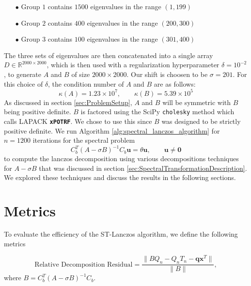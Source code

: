 \begin{itemize}
    \item[$\bullet$] Group $1$ contains $1500$ eigenvalues in the range $(1, 199)$
    \item[$\bullet$] Group $2$ contains $400$ eigenvalues in the range $(200, 300)$
    \item[$\bullet$] Group $3$ contains $100$ eigenvalues in the range $(301, 400)$
\end{itemize}

The three sets of eigenvalues are then concatenated into a single array $D \in \mathbb{R}^{2000 \times 2000}$, which is then used with a regularization hyperparameter $\delta = 10^{-2}$, to generate $A$ and $B$ of size $2000 \times 2000$. Our shift is choosen to be $\sigma = 201$. For this choice of $\delta$, the condition number of $A$ and $B$ are as follows:
\begin{equation*}
    \kappa(A) = 1.23 \times 10^7, \qquad \kappa(B) = 5.39 \times 10^5
\end{equation*}
As discussed in section \ref{sec:ProblemSetup}, $A$ and $B$ will be symmetric with $B$ being positive definite. $B$ is factored using the SciPy \texttt{cholesky} method which calls LAPACK \textbf{\texttt{xPOTRF}}. We chose to use this since $B$ was designed to be strictly positive definite. We run Algorithm \ref{alg:spectral_lanczos_algorithm} for $n=1200$ iterations for the spectral problem
\begin{equation}\label{eq:ShiftedInvertedProblem2}
	C_b^T (A-\sigma B)^{-1} C_b \mathbf{u} = \theta \mathbf{u}, \qquad \mathbf{u} \neq \mathbf{0}
\end{equation}
to compute the lanczos decomposition using various decompositions techniques for $A - \sigma B$ that was discussed in section \ref{sec:SpectralTransformationDescription}. We explored these techniques and discuss the results in the following sections.

\section{Metrics}
To evaluate the efficiency of the ST-Lanczos algorithm, we define the following metrics

\begin{equation}\label{eq:DecompositionResidual}
\text{Relative Decomposition Residual} = \frac{\|BQ_n - Q_nT_n - \mathbf{q}\mathbf{x}^T\|}{\|B\|},
\end{equation}
where $B = C_b^T (A-\sigma B)^{-1} C_b $.

